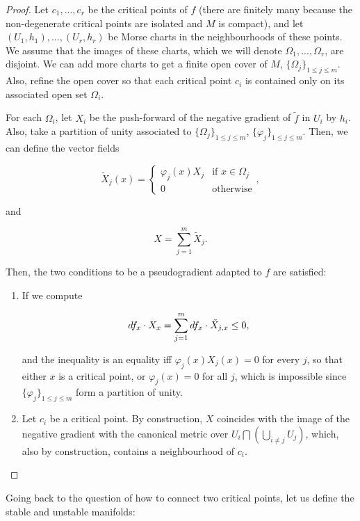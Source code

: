 \begin{proof}
Let $c_1,...,c_r$ be the critical points of $f$ (there are finitely many because the non-degenerate critical points are isolated and $M$ is compact), and let $(U_1,h_1),...,(U_r,h_r)$ be Morse charts in the neighbourhoods of these points. We assume that the images of these charts, which we will denote $\Omega_1,...,\Omega_r$, are disjoint. We can add more charts to get a finite open cover of $M$, $\{\Omega_j\}_{1 \leq j \leq m}$. Also, refine the open cover so that each critical point $c_i$ is contained only on its associated open set $\Omega_i$.

For each $\Omega_i$, let $X_i$ be the push-forward of the negative gradient of $\tilde{f}$ in $U_i$ by $h_i$. Also, take a partition of unity associated to $\{\Omega_j\}_{1 \leq j \leq m}$, $\{\varphi_j\}_{1 \leq j \leq m}$. Then, we can define the vector fields

$$\tilde{X}_j(x) = \left\{ \begin{array}{ll} \varphi_j(x) X_j & \text{if } x \in \Omega_j \\ 0 & \text{otherwise} \end{array} \right. ,$$

and

$$X = \sum_{j=1}^m \tilde{X}_j .$$

Then, the two conditions to be a pseudogradient adapted to $f$ are satisfied:

\begin{enumerate}
\item If we compute

$$\\d f_x \cdot X_x = \sum_{j=1}^m \\d f_x \cdot \tilde{X}_{j,x} \leq 0 ,$$

and the inequality is an equality iff $\varphi_j(x) X_j(x) = 0$ for every $j$, so that either $x$ is a critical point, or $\varphi_j(x)=0$ for all $j$, which is impossible since $\{\varphi_j\}_{1\leq j \leq m}$ form a partition of unity.
\item Let $c_i$ be a critical point. By construction, $X$ coincides with the image of the negative gradient with the canonical metric over $U_i \bigcap \left( \bigcup_{i \neq j} U_j\right)$, which, also by construction, contains a neighbourhood of $c_i$.
\end{enumerate}
\end{proof}

Going back to the question of how to connect two critical points, let us define the stable and unstable manifolds:

